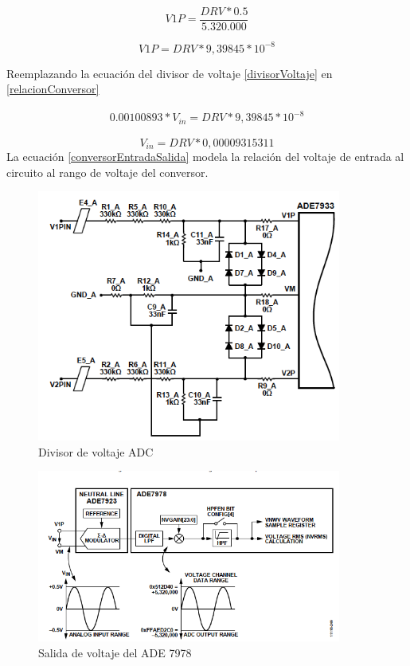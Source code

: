 \begin{equation}
    V1P = \frac{DRV * 0.5}{5.320.000}
\end{equation}

\begin{equation}\label{relacionConversor}
    V1P = DRV * 9,39845 * 10^{-8} 
\end{equation}

Reemplazando la ecuación del divisor de voltaje \ref{divisorVoltaje} en \ref{relacionConversor}

\begin{align*}
    0.00100893 * V_{in} = DRV * 9,39845 * 10^{-8} 
\end{align*}

\begin{equation}\label{conversorEntradaSalida}
    V_{in} = DRV * 0,00009315311
\end{equation}
La ecuación \ref{conversorEntradaSalida} modela la relación del voltaje de entrada al circuito al rango de voltaje del conversor.

\begin{figure}[H]
    \centering
    \includegraphics[width = 10cm]{3Proyecto/divisorVoltaje}
    \caption{Divisor de voltaje ADC} 
    \label{fig:divisorVolate}
\end{figure} 

\begin{figure}[H]
    \centering
    \includegraphics[width = 10cm]{3Proyecto/voltageOutput}
    \caption{Salida de voltaje del ADE 7978} 
    \label{fig:voltageOutput}
\end{figure} 


